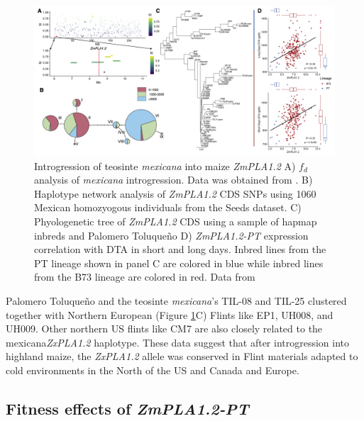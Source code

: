 \documentclass[9pt,twocolumn,twoside,lineno]{BioRxiv}
\begin{document}
\begin{figure}[ht]
\begin{center}
\includegraphics[width=0.8\paperwidth]{Figures/Fig_5.png}
\caption{Introgression of teosinte \textit{mexicana} into maize \textit{ZmPLA1.2}  
A) \(f_d\) analysis of \textit{mexicana} introgression. Data was obtained from \cite{Gonzalez-Segovia2019-jy}. 
B) Haplotype network analysis of \textit{ZmPLA1.2} CDS SNPs using 1060 Mexican homozyogous individuals from the Seeds dataset.
C) Phyologenetic tree of \textit{ZmPLA1.2} CDS using a sample of hapmap inbreds and Palomero Toluqueño
D) \textit{ZmPLA1.2-PT} expression correlation with DTA in short and long days. Inbred lines from the PT lineage shown in panel C are colored in blue while inbred lines from the B73 lineage are colored in red.
Data from \cite{Kremling2018-gn}}
\label{Fig5}
\end{center}
\end{figure} 

Palomero Toluqueño and the teosinte \textit{mexicana}'s TIL-08 and TIL-25 clustered together with Northern European (Figure \ref{Fig5}C) Flints like EP1, UH008, and UH009. 
Other northern US flints like CM7 are also closely related to the mexicana\textit{ZxPLA1.2} haplotype. 
These data suggest that after introgression into highland maize, the \textit{ZxPLA1.2} allele was conserved in Flint materials adapted to cold environments in the North of the US and Canada and Europe. 

\subsection{Fitness effects of \textit{ZmPLA1.2-PT}}
\end{document}
